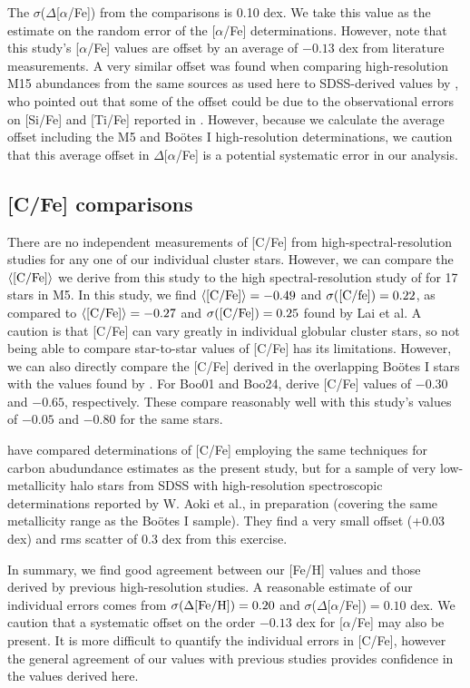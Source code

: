 \documentclass[iop]{emulateapj}
\def\bootes{Bo\"{o}tes I}
\begin{document}
The $\sigma$($\Delta$[$\alpha$/Fe]) from the comparisons is 0.10
dex. We take this value as the estimate on the random error of the
[$\alpha$/Fe] determinations. However, note that this study's [$\alpha$/Fe]
values are offset by an average of $-0.13$ dex from literature
measurements. A very similar offset was found when comparing
high-resolution M15 abundances from the same sources as used here to
SDSS-derived values by \citet{lee2010}, who pointed out that some of
the offset could be due to the observational errors on [Si/Fe] and
[Ti/Fe] reported in \citet{sneden97}. However, because we calculate
the average offset including the M5 and \bootes{} high-resolution
determinations, we caution that this average offset in
$\Delta$[$\alpha$/Fe] is a potential systematic error in our analysis.

\subsection{[C/Fe] comparisons}

There are no independent measurements of [C/Fe] from
high-spectral-resolution studies for any one of our individual cluster
stars. However, we can compare the $\langle {\rm [C/Fe]} \rangle$ we
derive from this study to the high spectral-resolution study of
\citet{lai11a} for 17 stars in M5. In this study, we find $\langle
{\rm [C/Fe]} \rangle=-0.49$ and $\sigma({\rm [C/fe]})=0.22$, as
compared to $\langle {\rm [C/Fe]} \rangle=-0.27$ and
$\sigma({\rm [C/Fe]})=0.25$ found by Lai et al. A caution is that [C/Fe] can
vary greatly in individual globular cluster stars, so not being able to compare
star-to-star values of [C/Fe] has its limitations. However, we can also directly
compare the [C/Fe] derived in the overlapping \bootes{} stars with the values
found by \citet{norris10b}. For Boo01 and Boo24, \citet{norris10b} derive [C/Fe]
values of $-0.30$ and $-0.65$, respectively. These compare reasonably well with
this study's values of $-0.05$ and $-0.80$ for the same stars. 

\citet{carollo11} have compared determinations of [C/Fe] employing the same techniques for
carbon abudundance estimates as the present study, but for a sample of very
low-metallicity halo stars from SDSS with high-resolution spectroscopic
determinations reported by W. Aoki et al., in preparation (covering the same
metallicity range as the \bootes{} sample). They find a very small offset
(+0.03 dex) and rms scatter of 0.3 dex from this exercise. 

In summary, we find good agreement between our [Fe/H] values and those derived
by previous high-resolution studies. A reasonable estimate of our individual
errors comes from $\sigma (\Delta{\rm [Fe/H]})=0.20$ and
$\sigma$($\Delta$[$\alpha$/Fe])$=0.10$ dex. We caution that a systematic offset
on the order $-0.13$ dex for [$\alpha$/Fe] may also be present. It is more
difficult to quantify the individual errors in [C/Fe], however the general
agreement of our values with previous studies provides confidence in the values
derived here.
\end{document}
